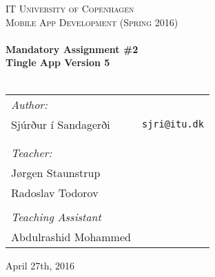 \begin{center}
  \thispagestyle{empty}

  \textsc{\LARGE IT University of Copenhagen}\\[0.5cm]
  \textsc{\Large Mobile App Development (Spring 2016)}\\[2cm]

  \HRule\\[0.4cm]
  {\huge \bfseries Mandatory Assignment \#2 \\Tingle App Version 5 \\[0.4cm]}
  \HRule\\[2cm]

  \begin{tabular}{lr}
  	\textit{Author:} \\
    Sjúrður í Sandagerði      & \texttt{sjri@itu.dk}\\
    \\
    \\
    \textit{Teacher:}\\
    Jørgen Staunstrup \\
    Radoslav Todorov \\
    \\
    \textit{Teaching Assistant}\\
    Abdulrashid Mohammed\\
  \end{tabular}

  \vfill
  {\large April 27th, 2016}
\end{center}
